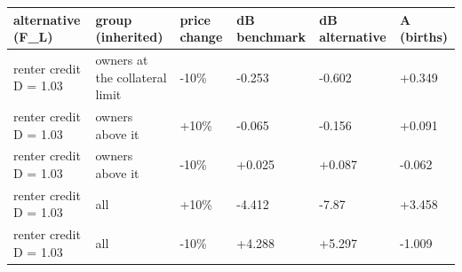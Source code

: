 \begingroup\small
\setlength{\tabcolsep}{3pt}
\renewcommand{\arraystretch}{1.04}
\begin{tabularx}{\linewidth}{XXXXXX}
\toprule
alternative (F\_L) & group (inherited) & price change & dB benchmark & dB alternative & A (births) \\
\midrule
renter credit D = 1.03 & owners at the collateral limit & -10\% & -0.253 & -0.602 & +0.349 \\
renter credit D = 1.03 & owners above it & +10\% & -0.065 & -0.156 & +0.091 \\
renter credit D = 1.03 & owners above it & -10\% & +0.025 & +0.087 & -0.062 \\
renter credit D = 1.03 & all & +10\% & -4.412 & -7.87 & +3.458 \\
renter credit D = 1.03 & all & -10\% & +4.288 & +5.297 & -1.009 \\
\bottomrule
\end{tabularx}
\endgroup
